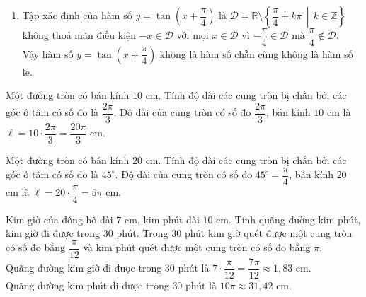 \begin{bt}
{\begin{enumerate}
			Đặt $f(x)=|x|+\tan x$. Xét hai giá trị $\dfrac{\pi}{4}$ và $-\dfrac{\pi}{4}$ thuộc $\mathscr{D}$, ta có
			$$
			f\left(\dfrac{\pi}{4}\right)=\left|\dfrac{\pi}{4}\right|+\tan \dfrac{\pi}{4}=\dfrac{\pi}{4}+1 \text { và } f\left(-\dfrac{\pi}{4}\right)=\left|-\dfrac{\pi}{4}\right|+\tan \left(-\dfrac{\pi}{4}\right)=\dfrac{\pi}{4}-1.
			$$		
			Do $f\left(-\dfrac{\pi}{4}\right) \neq f\left(\dfrac{\pi}{4}\right)$ và $f\left(-\dfrac{\pi}{4}\right) \neq-f\left(\dfrac{\pi}{4}\right)$ nên $y=|x|+\tan x$ không là hàm số chẵn cũng không là hàm số lẻ.
			\item Tập xác định của hàm số $y=\tan \left(x+\dfrac{\pi}{4}\right)$ là $\mathscr{D}=\mathbb{R} \setminus \left\{\dfrac{\pi}{4}+k \pi \,\middle|\, k \in \mathbb{Z}\right\}$ không thoả mãn điều kiện $-x \in \mathscr{D}$ với mọi $x \in \mathscr{D}$ vì $-\dfrac{\pi}{4} \in \mathscr{D}$ mà $\dfrac{\pi}{4} \notin \mathscr{D}$.\\
			Vậy hàm số $y=\tan \left(x+\dfrac{\pi}{4}\right)$ không là hàm số chẵn cũng không là hàm số lẻ.
		\end{enumerate}
	}
\end{bt}

\begin{vd}[MĐ1]%
	Một đường tròn có bán kính $10$ cm. Tính độ dài các cung tròn bị chắn bởi các góc ở tâm có số đo là $\dfrac{2\pi}{3}$.
	\loigiai
	{
		Độ dài của cung tròn có số đo $\dfrac{2\pi}{3}$, bán kính $10$ cm là $\ell = 10 \cdot \dfrac{2\pi}{3} = \dfrac{20\pi}{3}$ cm.
	}
\end{vd}

\begin{vd}[MĐ1]%
	Một đường tròn có bán kính $20$ cm. Tính độ dài các cung tròn bị chắn bởi các góc ở tâm có số đo là $45^\circ$.
	\loigiai
	{
		Độ dài của cung tròn có số đo $45^\circ = \dfrac{\pi}{4}$, bán kính $20$ cm là $\ell = 20 \cdot \dfrac{\pi}{4} = 5\pi$ cm.
	}
\end{vd}

\begin{vd}[MĐ2]%
	Kim giờ của đồng hồ dài $7$ cm, kim phút dài $10$ cm. Tính quãng đường kim phút, kim giờ đi được trong $30$ phút.
	\loigiai
	{
		Trong $30$ phút kim giờ quét được một cung tròn có số đo bằng $\dfrac{\pi}{12}$ và kim phút quét được một cung tròn có số đo bằng $\pi$.\\
		Quãng đường kim giờ đi được trong $30$ phút là $7\cdot \dfrac{\pi}{12} = \dfrac{7\pi}{12} \approx 1{,}83$ cm.\\
		Quãng đường kim phút đi được trong $30$ phút là $10 \pi \approx 31{,}42$ cm.
	}
\end{vd}

